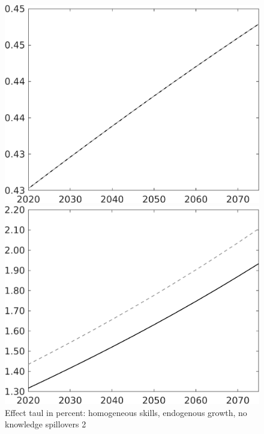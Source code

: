 \documentclass[12pt]{article}
\begin{document}
\begin{figure}[h!!]
	\centering
	\caption{Effect taul in percent: homogeneous skills, endogenous growth, no knowledge spillovers 2}\label{fig:LF_BAU_nsk1_xgr0_noknow2}
	
	\begin{minipage}[]{0.32\textwidth}
		\includegraphics[width=1\textwidth]{../../codding_model/own_basedOnFried/optimalPol_010922_revision/figures/all_13Sept22/CompTaul_LFBAU_Reg0_EY_spillover0_nsk1_xgr0_knspil1_sep1_countec0_GovRev0_etaa0.79_lgd0.png}
	\end{minipage}	
	\begin{minipage}[]{0.32\textwidth}
		\includegraphics[width=1\textwidth]{../../codding_model/own_basedOnFried/optimalPol_010922_revision/figures/all_13Sept22/CompTaul_LFBAU_Reg0_N_spillover0_nsk1_xgr0_knspil1_sep1_countec0_GovRev0_etaa0.79_lgd0.png}

\end{minipage}
\end{figure}
\end{document}
